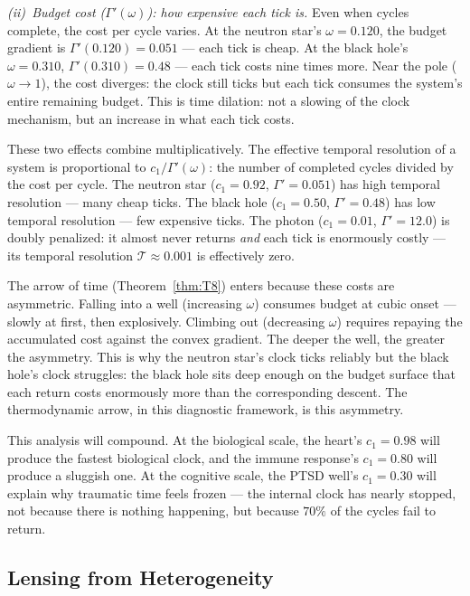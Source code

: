 \documentclass[
  aps,
  prd,
  twocolumn,
  superscriptaddress,
  nofootinbib,
  floatfix
]{revtex4-2}
\newcommand{\Gam}{\Gamma}
\begin{document}
\emph{(ii)~Budget cost ($\Gam'(\omega)$): how expensive
each tick is.}
Even when cycles complete, the cost per cycle varies.
At the neutron star's $\omega = 0.120$, the budget gradient
is $\Gam'(0.120) = 0.051$ --- each tick is cheap.  At the
black hole's $\omega = 0.310$, $\Gam'(0.310) = 0.48$ ---
each tick costs nine times more.  Near the pole
($\omega \to 1$), the cost diverges: the clock still ticks
but each tick consumes the system's entire remaining
budget.  This is time dilation: not a slowing of the clock
mechanism, but an increase in what each tick costs.

These two effects combine multiplicatively.  The effective
temporal resolution of a system is proportional to
$c_1 / \Gam'(\omega)$: the number of completed cycles
divided by the cost per cycle.  The neutron star
($c_1 = 0.92$, $\Gam' = 0.051$) has high temporal
resolution --- many cheap ticks.  The black hole
($c_1 = 0.50$, $\Gam' = 0.48$) has low temporal
resolution --- few expensive ticks.  The photon
($c_1 = 0.01$, $\Gam' = 12.0$) is doubly penalized: it
almost never returns \emph{and} each tick is enormously
costly --- its temporal resolution $\mathcal{T} \approx 0.001$
is effectively zero.

The arrow of time (Theorem~\ref{thm:T8}) enters because
these costs are asymmetric.  Falling into a well (increasing
$\omega$) consumes budget at cubic onset --- slowly at first,
then explosively.  Climbing out (decreasing $\omega$)
requires repaying the accumulated cost against the convex
gradient.  The deeper the well, the greater the asymmetry.
This is why the neutron star's clock ticks reliably but the
black hole's clock struggles: the black hole sits deep
enough on the budget surface that each return costs
enormously more than the corresponding descent.  The
thermodynamic arrow, in this diagnostic framework, is this
asymmetry.

This analysis will compound.  At the biological scale, the
heart's $c_1 = 0.98$ will produce the fastest biological
clock, and the immune response's $c_1 = 0.80$ will
produce a sluggish one.  At the cognitive scale, the PTSD
well's $c_1 = 0.30$ will explain why traumatic time feels
frozen --- the internal clock has nearly stopped, not
because there is nothing happening, but because $70\%$ of
the cycles fail to return.


\subsection{Lensing from Heterogeneity}
\end{document}
